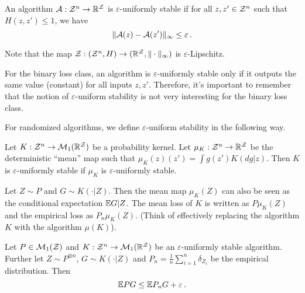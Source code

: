 \documentclass[twoside]{article}
\begin{document}
\begin{definition}
    An algorithm $\mathcal{A}: \mathcal{Z}^n \to \mathbb{R}^{\mathcal{Z}}$ is $\varepsilon$-uniformly stable if for all $z,z' \in \mathcal{Z}^n$ such that $H(z,z') \le 1$, we have 
    \[
        \|\mathcal{A}(z) - \mathcal{A}(z')\|_\infty \le \varepsilon \,.
    \]
\end{definition}
Note that the map $\mathcal{Z}: (\mathcal{Z}^n, H) \to (\mathbb{R}^{\mathcal{Z}}, \|\cdot\|_\infty)$ is $\varepsilon$-Lipschitz.
\begin{remark}
    For the binary loss class, an algorithm is $\varepsilon$-uniformly stable only if it outputs the same value (constant) for all inputs $z, z'$. Therefore, it's important to remember that the notion of $\varepsilon$-uniform stability is not very interesting for the binary loss class.
\end{remark}

For randomized algorithms, we define $\varepsilon$-uniform stability in the following way.
\begin{definition}
    Let $K:\mathcal{Z}^n \to \mathcal{M}_1(\mathbb{R}^{\mathcal{Z}})$ be a probability kernel. Let $\mu_K: \mathcal{Z}^n \to \mathbb{R}^{\mathcal{Z}}$ be the deterministic ``mean'' map such that $\mu_K(z)(z') = \int g(z') K(dg|z)$. Then $K$ is $\varepsilon$-uniformly stable if $\mu_K$ is $\varepsilon$-uniformly stable. 
\end{definition}

Let $Z \sim P$ and $G \sim K(\cdot | Z)$. Then the mean map $\mu_K(Z)$ can also be seen as the conditional expectation $\mathbb{E}{G | Z}$. The mean loss of $K$ is written as $P\mu_K(Z)$ and the empirical loss as $P_n \mu_K(Z)$. (Think of effectively replacing the algorithm $K$ with the algorithm $\mu(K)$).

\begin{proposition}
    Let $P \in \mathcal{M}_1(\mathcal{Z})$ and $K:\mathcal{Z}^n \to \mathcal{M}_1(\mathbb{R}^{\mathcal{Z}})$ be an $\varepsilon$-uniformly stable algorithm. Further let $Z \sim P^{\otimes n}$, $G \sim K(\cdot | Z)$ and $P_n = \frac1n \sum_{i=1}^n \delta_{Z_i}$ be the empirical distribution. Then 
    \[
        \mathbb{E}{PG} \le \mathbb{E}{P_n G} + \varepsilon \,.
    \]
\end{proposition}
\end{document}
